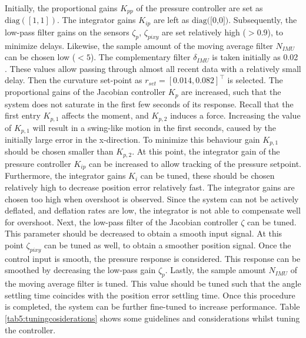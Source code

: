 Initially, the proportional gains $K_{pp}$ of the pressure controller are set as $\text{diag}([1,1])$. The integrator gains $K_{ip}$ are left as $\text{diag([0,0])}$. Subsequently, the low-pass filter gains on the sensors $\zeta_p$, $\zeta_{pixy}$ are set relatively high ($>0.9$), to minimize delays. Likewise, the sample amount of the moving average filter $N_{IMU}$ can be chosen low ($<5$). The complementary filter $\delta_{IMU}$ is taken initially as 0.02 \cite{compfilter}. These values allow passing through almost all recent data with a relatively small delay. Then the curvature set-point as $r_{set} = [0.014,0.082]^\top$ is selected. The proportional gains of the Jacobian controller $K_p$ are increased, such that the system does not saturate in the first few seconds of its response. Recall that the first entry $K_{p,1}$ affects the moment, and $K_{p,2}$ induces a force. Increasing the value of $K_{p,1}$ will result in a swing-like motion in the first seconds, caused by the initially large error in the x-direction. To minimize this behaviour gain $K_{p,1}$ should be chosen smaller than $K_{p,2}$. At this point, the integrator gain of the pressure controller $K_{ip}$ can be increased to allow tracking of the pressure setpoint. Furthermore, the integrator gains $K_i$ can be tuned, these should be chosen relatively high to decrease position error relatively fast. The integrator gains are chosen too high when overshoot is observed. Since the system can not be actively deflated, and deflation rates are low, the integrator is not able to compensate well for overshoot. Next, the low-pass filter of the Jacobian controller $\zeta$ can be tuned. This parameter should be decreased to obtain a smooth input signal. At this point $\zeta_{pixy}$ can be tuned as well, to obtain a smoother position signal. Once the control input is smooth, the pressure response is considered. This response can be smoothed by decreasing the low-pass gain $\zeta_p$. Lastly, the sample amount $N_{IMU}$ of the moving average filter is tuned. This value should be tuned such that the angle settling time coincides with the position error settling time. Once this procedure is completed, the system can be further fine-tuned to increase performance. Table \ref{tab5:tuningcosiderations} shows some guidelines and considerations whilst tuning the controller.



